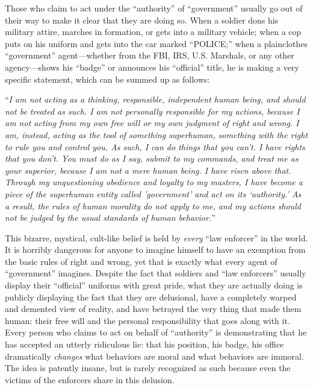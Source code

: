 \documentclass{book}
\begin{document}
Those who claim to act under the \enquote{authority} of \enquote{government} usually go out of their way to make it clear that they are doing so. When a soldier dons his military attire, marches in formation, or gets into a military vehicle; when a cop puts on his uniform and gets into the car marked \enquote{POLICE;} when a plainclothes \enquote{government} agent---whether from the FBI, IRS, U.S. Marshals, or any other agency---shows his \enquote{badge} or announces his \enquote{official} title, he is making a very specific statement, which can be summed up as follows:

\enquote{\emph{I am not acting as a thinking, responsible, independent human being, and should not be treated as such. I am not personally responsible for my actions, because I am not acting from my own free will or my own judgment of right and wrong. I am, instead, acting as the tool of something superhuman, something with the right to rule you and control you. As such, I can do things that you can't. I have rights that you don't. You must do as I say, submit to my commands, and treat me as your superior, because I am not a mere human being. I have risen above that. Through my unquestioning obedience and loyalty to my masters, I have become a piece of the superhuman entity called 'government' and act on its ‘authority.' As a result, the rules of human morality do not apply to me, and my actions should not be judged by the usual standards of human behavior.}}

This bizarre, mystical, cult-like belief is held by \emph{every} \enquote{law enforcer} in the world. It is horribly dangerous for anyone to imagine himself to have an exemption from the basic rules of right and wrong, yet that is exactly what every agent of \enquote{government} imagines. Despite the fact that soldiers and \enquote{law enforcers} usually display their \enquote{official} uniforms with great pride, what they are actually doing is publicly displaying the fact that they are delusional, have a completely warped and demented view of reality, and have betrayed the very thing that made them human: their free will and the personal responsibility that goes along with it. Every person who claims to act on behalf of \enquote{authority} is demonstrating that he has accepted an utterly ridiculous lie: that his position, his badge, his office dramatically \emph{changes} what behaviors are moral and what behaviors are immoral. The idea is patently insane, but is rarely recognized as such because even the victims of the enforcers share in this delusion.
\end{document}
